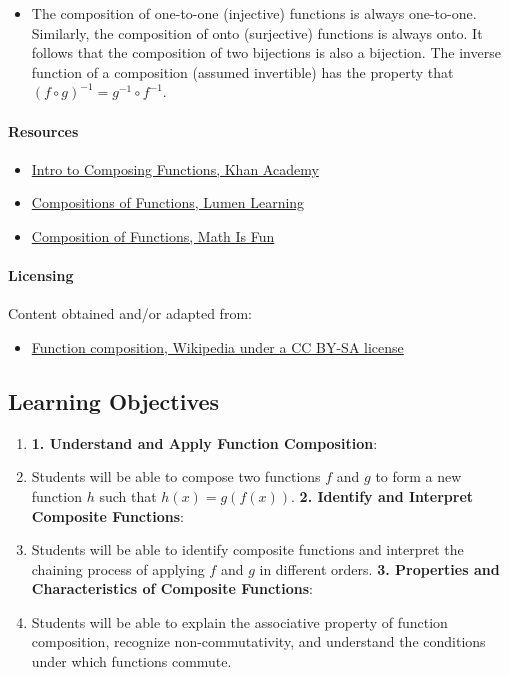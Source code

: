 
\begin{itemize}
    \item The composition of one-to-one (injective) functions is always one-to-one. Similarly, the composition of onto (surjective) functions is always onto. It follows that the composition of two bijections is also a bijection. The inverse function of a composition (assumed invertible) has the property that $(f \circ g)^{-1} = g^{-1} \circ f^{-1}$.
\end{itemize}

\paragraph{Resources}

\begin{itemize}
    \item \href{https://www.khanacademy.org/math/precalculus/x9e81a4f98389efdf:composite/x9e81a4f98389efdf:composing/v/function-composition}{Intro to Composing Functions, Khan Academy}
    \item \href{https://courses.lumenlearning.com/wmopen-collegealgebra/chapter/introduction-compositions-of-functions/}{Compositions of Functions, Lumen Learning}
    \item \href{https://www.mathsisfun.com/sets/functions-composition.html}{Composition of Functions, Math Is Fun}
\end{itemize}

\paragraph{Licensing}

Content obtained and/or adapted from:

\begin{itemize}
    \item \href{https://en.wikipedia.org/wiki/Function_composition}{Function composition, Wikipedia under a CC BY-SA license}
\end{itemize}

\subsection{Learning Objectives}

\begin{enumerate}
    \item \textbf{1. Understand and Apply Function Composition}:
    \item Students will be able to compose two functions $f$ and $g$ to form a new function $h$ such that $h(x) = g(f(x))$. \textbf{2. Identify and Interpret Composite Functions}:
    \item Students will be able to identify composite functions and interpret the chaining process of applying $f$ and $g$ in different orders. \textbf{3. Properties and Characteristics of Composite Functions}:
    \item Students will be able to explain the associative property of function composition, recognize non-commutativity, and understand the conditions under which functions commute.
\end{enumerate}

